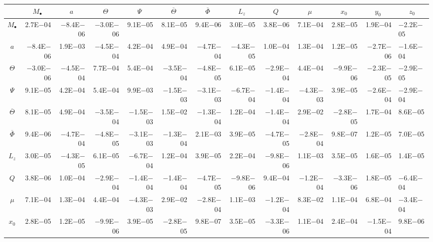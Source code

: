\begin{sidewaystable}[htbp]\squeezetable
\centering
\begin{tabular}{crrrrrrrrrrr}
\toprule
 &  &  &  &  &  &  &  &  &  &  &  &  \\ \midrule 
$M_\bullet$ & 2.7E$-$04 & $-$8.4E$-$06 & $-$3.0E$-$06 & 9.1E$-$05 & 8.1E$-$05 & 9.4E$-$06 & 3.0E$-$05 & 3.8E$-$06 & 7.1E$-$04 & 2.8E$-$05 & 1.9E$-$04 & $-$2.2E$-$05 \\
$a$ & $-$8.4E$-$06 & 1.9E$-$03 & $-$4.5E$-$04 & 4.2E$-$04 & 4.9E$-$04 & $-$4.7E$-$04 & $-$4.3E$-$05 & 1.0E$-$04 & 1.3E$-$04 & 1.2E$-$05 & $-$2.7E$-$06 & $-$1.6E$-$04 \\
$\Theta$ & $-$3.0E$-$06 & $-$4.5E$-$04 & 7.7E$-$04 & 5.4E$-$04 & $-$3.5E$-$04 & $-$4.8E$-$05 & 6.1E$-$05 & $-$2.9E$-$04 & 4.4E$-$04 & $-$9.9E$-$06 & $-$2.3E$-$05 & $-$2.9E$-$05 \\
$\Psi$ & 9.1E$-$05 & 4.2E$-$04 & 5.4E$-$04 & 9.9E$-$03 & $-$1.5E$-$03 & $-$3.1E$-$03 & $-$6.7E$-$04 & $-$1.4E$-$04 & $-$4.3E$-$03 & 3.9E$-$05 & $-$2.6E$-$04 & $-$2.9E$-$04 \\
$\overline{\Theta}$ & 8.1E$-$05 & 4.9E$-$04 & $-$3.5E$-$04 & $-$1.5E$-$03 & 1.5E$-$02 & $-$1.3E$-$04 & 1.2E$-$04 & $-$1.4E$-$04 & 2.9E$-$02 & $-$2.8E$-$05 & 1.7E$-$04 & 8.6E$-$05 \\
$\overline{\Phi}$ & 9.4E$-$06 & $-$4.7E$-$04 & $-$4.8E$-$05 & $-$3.1E$-$03 & $-$1.3E$-$04 & 2.1E$-$03 & 3.9E$-$05 & $-$4.7E$-$05 & $-$2.8E$-$04 & 9.8E$-$07 & 1.2E$-$05 & 7.0E$-$05 \\
$L_z$ & 3.0E$-$05 & $-$4.3E$-$05 & 6.1E$-$05 & $-$6.7E$-$04 & 1.2E$-$04 & 3.9E$-$05 & 2.2E$-$04 & $-$9.8E$-$06 & 1.1E$-$03 & 3.5E$-$05 & 1.6E$-$05 & 1.4E$-$05 \\
$Q$ & 3.8E$-$06 & 1.0E$-$04 & $-$2.9E$-$04 & $-$1.4E$-$04 & $-$1.4E$-$04 & $-$4.7E$-$05 & $-$9.8E$-$06 & 9.4E$-$04 & $-$1.2E$-$04 & $-$3.3E$-$06 & 1.8E$-$05 & $-$6.4E$-$04 \\
$\mu$ & 7.1E$-$04 & 1.3E$-$04 & 4.4E$-$04 & $-$4.3E$-$03 & 2.9E$-$02 & $-$2.8E$-$04 & 1.1E$-$03 & $-$1.2E$-$04 & 8.3E$-$02 & 1.1E$-$04 & 6.8E$-$04 & $-$3.4E$-$04 \\
$x_0$ & 2.8E$-$05 & 1.2E$-$05 & $-$9.9E$-$06 & 3.9E$-$05 & $-$2.8E$-$05 & 9.8E$-$07 & 3.5E$-$05 & $-$3.3E$-$06 & 1.1E$-$04 & 2.4E$-$04 & $-$1.5E$-$04 & 9.8E$-$06 \\

\end{tabular}
\end{sidewaystable}
